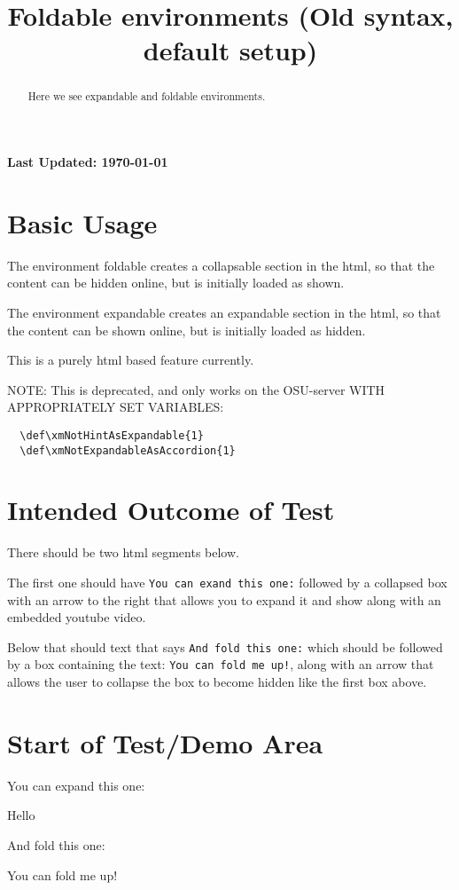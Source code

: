 \documentclass{ximera}
\title{Foldable environments (Old syntax, default setup)}
\begin{document}
\begin{abstract}
  Here we see expandable and foldable environments.
\end{abstract}
\maketitle

{{\Huge \bfseries Last Updated: \today}} \\

\section{Basic Usage}
The environment foldable creates a collapsable section in the html, so that the content can be hidden online, but is initially loaded as shown.

The environment expandable creates an expandable section in the html, so that the content can be shown online, but is initially loaded as hidden.

This is a purely html based feature currently.

NOTE: This is deprecated, and only works on the OSU-server WITH APPROPRIATELY SET VARIABLES:

\begin{verbatim}
  \def\xmNotHintAsExpandable{1}
  \def\xmNotExpandableAsAccordion{1}
\end{verbatim}

\section{Intended Outcome of Test}

There should be two html segments below. 

The first one should have \texttt{You can exand this one:} followed by 
a collapsed box with an arrow to the right that allows you to expand it and show  along with an embedded youtube video.

Below that should text that says \texttt{And fold this one:} which should be followed by a box containing the text:
\texttt{You can fold me up!}, along with an arrow that allows the user to collapse the box to become hidden like the 
first box above.


\section{Start of Test/Demo Area}

You can expand this one:

\begin{expandable}
  Hello
 \begin{center}
 \end{center}
\end{expandable}



And fold this one:

\begin{foldable}
  You can fold me up!
\end{foldable}


\hrulefill
\end{document}
